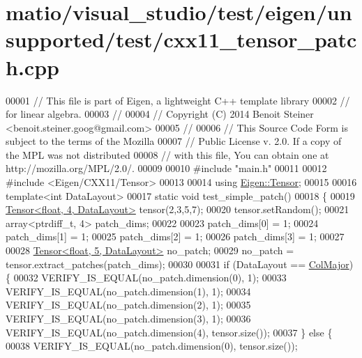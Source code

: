 \hypertarget{matio_2visual__studio_2test_2eigen_2unsupported_2test_2cxx11__tensor__patch_8cpp_source}{}\section{matio/visual\+\_\+studio/test/eigen/unsupported/test/cxx11\+\_\+tensor\+\_\+patch.cpp}
\label{matio_2visual__studio_2test_2eigen_2unsupported_2test_2cxx11__tensor__patch_8cpp_source}

\begin{DoxyCode}
00001 \textcolor{comment}{// This file is part of Eigen, a lightweight C++ template library}
00002 \textcolor{comment}{// for linear algebra.}
00003 \textcolor{comment}{//}
00004 \textcolor{comment}{// Copyright (C) 2014 Benoit Steiner <benoit.steiner.goog@gmail.com>}
00005 \textcolor{comment}{//}
00006 \textcolor{comment}{// This Source Code Form is subject to the terms of the Mozilla}
00007 \textcolor{comment}{// Public License v. 2.0. If a copy of the MPL was not distributed}
00008 \textcolor{comment}{// with this file, You can obtain one at http://mozilla.org/MPL/2.0/.}
00009 
00010 \textcolor{preprocessor}{#include "main.h"}
00011 
00012 \textcolor{preprocessor}{#include <Eigen/CXX11/Tensor>}
00013 
00014 \textcolor{keyword}{using} \hyperlink{class_eigen_1_1_tensor}{Eigen::Tensor};
00015 
00016 \textcolor{keyword}{template}<\textcolor{keywordtype}{int} DataLayout>
00017 \textcolor{keyword}{static} \textcolor{keywordtype}{void} test\_simple\_patch()
00018 \{
00019   \hyperlink{class_eigen_1_1_tensor}{Tensor<float, 4, DataLayout>} tensor(2,3,5,7);
00020   tensor.setRandom();
00021   array<ptrdiff\_t, 4> patch\_dims;
00022 
00023   patch\_dims[0] = 1;
00024   patch\_dims[1] = 1;
00025   patch\_dims[2] = 1;
00026   patch\_dims[3] = 1;
00027 
00028   \hyperlink{class_eigen_1_1_tensor}{Tensor<float, 5, DataLayout>} no\_patch;
00029   no\_patch = tensor.extract\_patches(patch\_dims);
00030 
00031   \textcolor{keywordflow}{if} (DataLayout == \hyperlink{group__enums_ggaacded1a18ae58b0f554751f6cdf9eb13a0cbd4bdd0abcfc0224c5fcb5e4f6669a}{ColMajor}) \{
00032     VERIFY\_IS\_EQUAL(no\_patch.dimension(0), 1);
00033     VERIFY\_IS\_EQUAL(no\_patch.dimension(1), 1);
00034     VERIFY\_IS\_EQUAL(no\_patch.dimension(2), 1);
00035     VERIFY\_IS\_EQUAL(no\_patch.dimension(3), 1);
00036     VERIFY\_IS\_EQUAL(no\_patch.dimension(4), tensor.size());
00037   \} \textcolor{keywordflow}{else} \{
00038     VERIFY\_IS\_EQUAL(no\_patch.dimension(0), tensor.size());

\end{DoxyCode}
